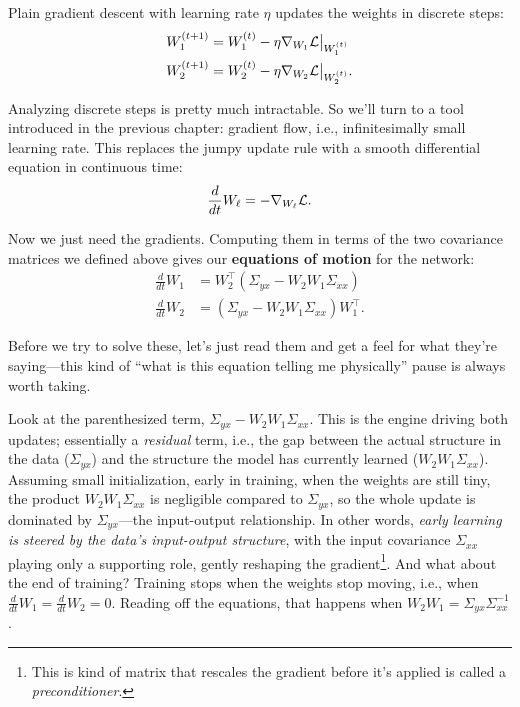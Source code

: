 Plain gradient descent with learning rate $\eta$ updates the weights in discrete
steps:
\begin{align*}
    W_1^{(t+1)} &= W_1^{(t)} - \eta \nabla_{W_1}{\mathcal{L}}\big|_{W_1^{(t)}} \\
    W_2^{(t+1)} &= W_2^{(t)} - \eta \nabla_{W_2}{\mathcal{L}}\big|_{W_2^{(t)}}.
\end{align*}

Analyzing discrete steps is pretty much intractable. So we'll turn to a tool introduced in the previous chapter: gradient flow, i.e., infinitesimally small learning rate. This replaces the jumpy update rule with a smooth differential equation in continuous time:
\begin{align*}
    \frac{d}{dt}W_\ell = -\nabla_{W_\ell}{\mathcal{L}}.
\end{align*}

Now we just need the gradients. Computing them in terms of the two covariance
matrices we defined above gives our \textbf{equations of motion} for the network:
\begin{align}
    \frac{d}{dt}W_1 &= W_2^\top(\Sigma_{yx} - W_2 W_1 \Sigma_{xx})\label{eq:W1}\\
    \frac{d}{dt}W_2 &= (\Sigma_{yx} - W_2 W_1 \Sigma_{xx}) W_1^\top .\label{eq:W2}
\end{align}

Before we try to solve these, let's just read them and get a feel for what they're saying---this kind of ``what is this equation telling me physically'' pause is always worth taking.

Look at the parenthesized term, $\Sigma_{yx} - W_2 W_1 \Sigma_{xx}$. This is the engine driving both updates; essentially a \textit{residual} term, i.e., the gap between the actual structure in the data ($\Sigma_{yx}$) and the structure the model has currently learned ($W_2 W_1 \Sigma_{xx}$). Assuming small initialization, early in training, when the weights are still tiny, the product $W_2 W_1 \Sigma_{xx}$ is negligible compared to $\Sigma_{yx}$, so the whole update is dominated by $\Sigma_{yx}$---the input-output relationship. In other words, \emph{early learning is steered by the data's input-output structure}, with the
input covariance $\Sigma_{xx}$ playing only a supporting role, gently reshaping the gradient\footnote{This is kind of matrix that rescales the gradient before it's applied is called a \textit{preconditioner}.}. And what about the end of training? Training stops when the weights stop moving, i.e., when $\frac{d}{dt}W_1 = \frac{d}{dt}W_2 = 0$. Reading off the equations,
that happens when $W_2 W_1 = \Sigma_{yx}\Sigma_{xx}^{-1}$.

